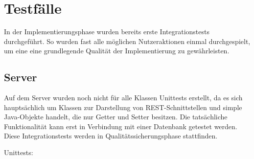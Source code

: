 \section{Testfälle}
In der Implementierungsphase wurden bereits erste Integrationstests durchgeführt. So wurden fast alle möglichen Nutzeraktionen einmal durchgespielt, um eine eine grundlegende Qualität der Implementierung zu gewährleisten.
\subsection{Server}
Auf dem Server wurden noch nicht für alle Klassen Unittests erstellt, da es sich hauptsächlich um Klassen zur Darstellung von REST-Schnittstellen und simple Java-Objekte handelt, die nur Getter und Setter besitzen. Die tatsächliche Funktionalität kann erst in Verbindung mit einer Datenbank getestet werden. Diese Integrationstests werden in Qualitätssicherungsphase stattfinden.


Unittests:

